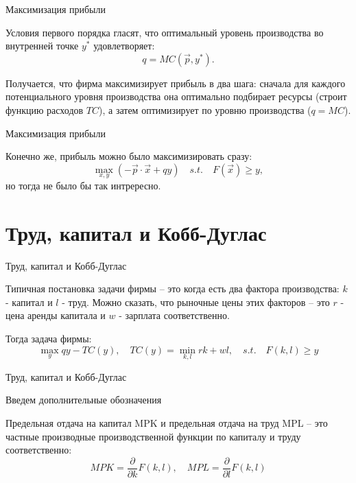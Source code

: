 \documentclass{beamer}
\begin{document}
\begin{frame}{Максимизация прибыли}

Условия первого порядка гласят, что оптимальный уровень производства во внутренней точке $y^{\ast}$ удовлетворяет:
$$ q = MC(\vec p, y^{\ast}).$$

Получается, что фирма максимизирует прибыль в два шага: сначала для каждого потенциального уровня производства она оптимально подбирает ресурсы (строит функцию расходов $TC$), а затем оптимизирует по уровню производства ($q = MC$). 

\end{frame}

\begin{frame}{Максимизация прибыли}

Конечно же, прибыль можно было максимизировать сразу:
$$ \max_{x,y} (- \vec p \cdot \vec x + q y) \quad s.t. \quad F(\vec x)  \geqslant y,$$
но тогда не было бы так интрересно.

\end{frame}

\section{Труд, капитал и Кобб-Дуглас}

\begin{frame}{Труд, капитал и Кобб-Дуглас}

Типичная постановка задачи фирмы – это когда есть два фактора производства: $k$ - капитал и $l$ - труд. Можно сказать, что рыночные цены этих факторов – это $r$ - цена аренды капитала и $w$ - зарплата соответственно. 

Тогда задача фирмы:
$$ \max_y q y - TC(y), \quad TC(y) = \min_{k,l} rk + wl, \quad s.t. \quad F(k,l) \geqslant y$$

\end{frame}

\begin{frame}{Труд, капитал и Кобб-Дуглас}

Введем дополнительные обозначения

\begin{definition}
\alert{Предельная отдача на капитал} MPK и \alert{предельная отдача на труд} MPL – это частные производные производственной функции по капиталу и труду соответственно:
$$MPK = \frac{\partial}{\partial k}F(k,l), \quad MPL = \frac{\partial}{\partial l}F(k,l)$$
\end{definition}

\end{frame}
\end{document}
